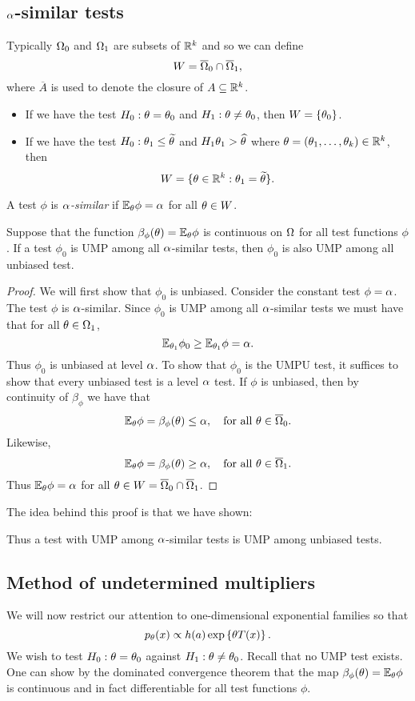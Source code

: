 \subsection{${\alpha}$-similar tests}
Typically ${{\Omega}}_0$ and ${{\Omega}}_1$ are subsets of ${\mathbb R}^k$ and so we can define 
\[W = \overline{{{\Omega}}}_0 \cap \overline{{{\Omega}}}_1, \]
where $\overline{A}$ is used to denote the closure of $A \subseteq {\mathbb R}^k$. 
\begin{exs}
\begin{itemize}
    \item If we have the test $H_0: {\theta} = {\theta}_0$ and $H_1 : {\theta} \neq {\theta}_0$, then $W = \{{\theta}_0\}$.
    \item If we have the test $H_0 : {\theta}_1 \le \widetilde{{\theta}}$ and $H_1 {\theta}_1 > \widehat{{\theta}}$ where ${\theta} = ({\theta}_1,\ldots, {\theta}_k) \in {\mathbb R}^k$, then \[W = \{{\theta} \in {\mathbb R}^k : {\theta}_1 = \widetilde{{\theta}}\}.\]
\end{itemize}
\end{exs}
\begin{defn}
    A test $\phi$ is \emph{${\alpha}$-similar} if ${\mathbb{E}}_{\theta} \phi = {\alpha}$ for all ${\theta} \in W$.
\end{defn}
\begin{lemma}
    Suppose that the function $\beta_\phi({\theta}) = {\mathbb{E}}_{\theta} \phi$ is continuous on ${{\Omega}}$ for all test functions $\phi$. If a test $\phi_0$ is UMP among all ${\alpha}$-similar tests, then $\phi_0$ is also UMP among all unbiased test.
\end{lemma}
\begin{proof}
    We will first show that $\phi_0$ is unbiased. Consider the constant test $\phi = {\alpha}$. The test $\phi$ is ${\alpha}$-similar. Since $\phi_0$ is UMP among all ${\alpha}$-similar tests we must have that for all ${\theta} \in {{\Omega}}_1$,
    \[{\mathbb{E}}_{{\theta}_1}\phi_0 \ge {\mathbb{E}}_{{\theta}_1} \phi = {\alpha}. \]
    Thus $\phi_0$ is unbiased at level ${\alpha}$. To show that $\phi_0$ is the UMPU test, it suffices to show that every unbiased test is a level ${\alpha}$ test. If $\phi$ is unbiased, then by continuity of $\beta_\phi$ we have that 
    \[{\mathbb{E}}_{{\theta}} \phi = \beta_\phi({\theta}) \le {\alpha},~~~\text{for all } {\theta} \in \overline{{{\Omega}}}_0. \]
    Likewise,
    \[{\mathbb{E}}_{{\theta}} \phi = \beta_\phi({\theta}) \ge {\alpha},~~~\text{for all } {\theta} \in \overline{{{\Omega}}}_1. \]
    Thus ${\mathbb{E}}_{\theta} \phi = {\alpha}$ for all ${\theta} \in W = \overline{{{\Omega}}}_0 \cap \overline{{{\Omega}}}_1$.
\end{proof}
The idea behind this proof is that we have shown:

Thus a test with UMP among ${\alpha}$-similar tests is UMP among unbiased tests.

\subsection{Method of undetermined multipliers}
We will now restrict our attention to one-dimensional exponential families so that 
\[p_{\theta}(x) \propto h(a)\exp\left\{{\theta} T(x)\right\}.\]
We wish to test $H_0 : {\theta}={\theta}_0$ against $H_1 :{\theta} \neq {\theta}_0$. Recall that no UMP test exists. One can show by the dominated convergence theorem that the map $\beta_\phi({\theta}) = {\mathbb{E}}_{\theta} \phi$ is continuous and in fact differentiable for all test functions $\phi$. 

